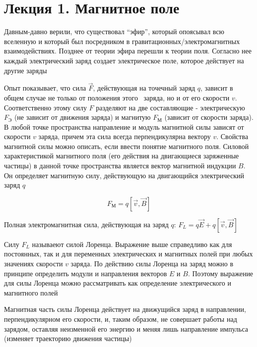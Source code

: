 \documentclass[12pt]{article}
\begin{document}
    \tableofcontents
    \clearpage






\section{Лекция 1. Магнитное поле}

Давным-давно верили, что существовал \enquote{эфир}, который опоясывал всю вселенную и который был посредником в гравитационных/электромагнитных 
взаимодействиях. Позднее от теории эфира перешли к теории поля. Согласно нее каждый электрический заряд создает электрическое поле, 
которое действует на другие заряды

Опыт показывает, что сила $\vec{F}$, действующая на точечный заряд $q$, зависит в общем случае не только от положения этого \
заряда, но и от его скорости $v$. Соответственно этому силу $F$ разделяют на две составляющие - электрическую $F_\text{Э}$ 
(не зависит от движения заряда) и магнитую $F_\text{М}$ (зависит от скорости заряда). В любой точке пространства направление и модуль
магнитной силы зависят от скорости $v$ заряда, причем эта сила всегда перпендикулярна вектору $v$. Свойства магнитной 
силы можно описать, если ввести понятие магнитного поля. Силовой характеристикой магнитного поля (его действия на двигающиеся заряженные частицы)
в данной точке пространства является вектор магнитной индукции $B$. Он определяет магнитную силу, действующую на двигающийся электрический заряд $q$

\[F_\text{М} = q [\vec{v}, \vec{B}]\]

Полная электромагнитная сила, действующая на заряд $q$: $F_L = q\vec{E} + q[\vec{v}, \vec{B}]$

Силу $F_L$ называеют силой Лоренца. Выражение выше справедливо как для постоянных, так и для переменных
электрических и магнитных полей при любых значениях скорости $v$ заряда. По действию силы Лоренца
на заряд можно в принципе определить модули и направления векторов $E$ и $B$. Поэтому выражение для силы Лоренца
можно рассматривать как определение электрического и магнитного полей

Магнитная часть силы Лоренца действует на движущийся заряд в направлении, перпендикулярном его скорости, и,
таким образом, не совершает работы над зарядом, оставляя неизменной его энергию и меняя лишь направление импульса
(изменяет траекторию движения частицы)
\end{document}

